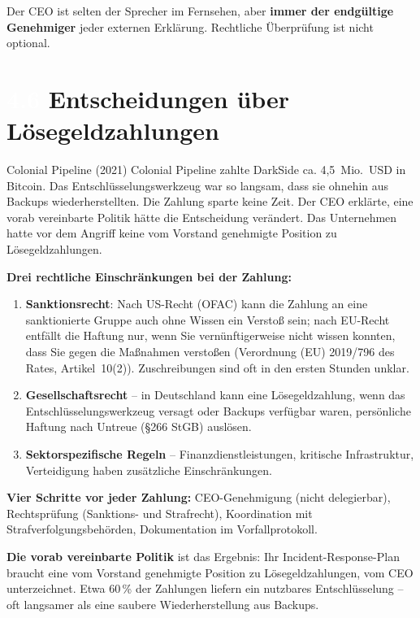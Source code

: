\documentclass[11pt,a4paper,twoside]{book}
\newcommand{\lessontag}[1]{%
  \texorpdfstring{%
    \setlength{\fboxsep}{3pt}\colorbox{nisd2blue}{\textcolor{white}{\footnotesize\bfseries #1}}\quad%
  }{Lektion #1\ }%
}
\begin{document}
Der CEO ist selten der Sprecher im Fernsehen, aber \textbf{immer der endgültige Genehmiger} jeder externen Erklärung. Rechtliche Überprüfung ist nicht optional.

\section{\lessontag{4.6}Entscheidungen über Lösegeldzahlungen}

\begin{casestudy}{Colonial Pipeline (2021)}
Colonial Pipeline zahlte DarkSide ca. 4,5~Mio.~USD in Bitcoin. Das Entschlüsselungswerkzeug war so langsam, dass sie ohnehin aus Backups wiederherstellten. Die Zahlung sparte keine Zeit. Der CEO erklärte, eine vorab vereinbarte Politik hätte die Entscheidung verändert. Das Unternehmen hatte vor dem Angriff keine vom Vorstand genehmigte Position zu Lösegeldzahlungen.
\end{casestudy}

\textbf{Drei rechtliche Einschränkungen bei der Zahlung:}
\begin{enumerate}
  \item \textbf{Sanktionsrecht}: Nach US-Recht (OFAC) kann die Zahlung an eine sanktionierte Gruppe auch ohne Wissen ein Verstoß sein; nach EU-Recht entfällt die Haftung nur, wenn Sie vernünftigerweise nicht wissen konnten, dass Sie gegen die Maßnahmen verstoßen (Verordnung (EU) 2019/796 des Rates, Artikel~10(2)). Zuschreibungen sind oft in den ersten Stunden unklar.
  \item \textbf{Gesellschaftsrecht} -- in Deutschland kann eine Lösegeldzahlung, wenn das Entschlüsselungswerkzeug versagt oder Backups verfügbar waren, persönliche Haftung nach Untreue (\S{}266 StGB) auslösen.
  \item \textbf{Sektorspezifische Regeln} -- Finanzdienstleistungen, kritische Infrastruktur, Verteidigung haben zusätzliche Einschränkungen.
\end{enumerate}

\textbf{Vier Schritte vor jeder Zahlung:} CEO-Genehmigung (nicht delegierbar), Rechtsprüfung (Sanktions- und Strafrecht), Koordination mit Strafverfolgungsbehörden, Dokumentation im Vorfallprotokoll.

\textbf{Die vorab vereinbarte Politik} ist das Ergebnis: Ihr Incident-Response-Plan braucht eine vom Vorstand genehmigte Position zu Lösegeldzahlungen, vom CEO unterzeichnet. Etwa 60\,\% der Zahlungen liefern ein nutzbares Entschlüsselung -- oft langsamer als eine saubere Wiederherstellung aus Backups.
\end{document}
